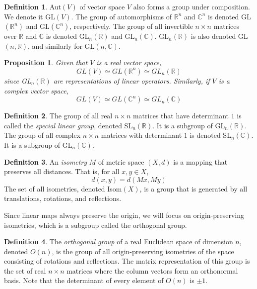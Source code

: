 \documentclass{article}
\newtheorem{proposition}[theorem]{Proposition}
\theoremstyle{remark}
\theoremstyle{definition}
\newtheorem{definition}{Definition}[section]
\begin{document}
    \begin{definition}
    Aut$(V)$ of vector space $V$ also forms a group under composition. We denote it GL$(V)$. The group of automorphisms of $\mathbb{R}^n$ and $\mathbb{C}^n$ is denoted GL$(\mathbb{R}^n)$ and GL$(\mathbb{C}^n)$, respectively. The group of all invertible $n \times n$ matrices over $\mathbb{R}$ and $\mathbb{C}$ is denoted GL$_n(\mathbb{R})$ and GL$_n(\mathbb{C})$. GL$_n(\mathbb{R})$ is also denoted GL$(n, \mathbb{R})$, and similarly for GL$(n, \mathbb{C})$. 
    \end{definition}

    \begin{proposition}
    Given that $V$ is a real vector space, 
    \[GL(V) \simeq GL(\mathbb{R}^n) \simeq GL_n (\mathbb{R})\]
    since GL$_n(\mathbb{R})$ are representations of linear operators. Similarly, if $V$ is a complex vector space, 
    \[GL(V) \simeq GL(\mathbb{C}^n) \simeq GL_n (\mathbb{C})\]
    \end{proposition}

    \begin{definition}
    The group of all real $n \times n$ matrices that have determinant $1$ is called the \textit{special linear group}, denoted SL$_n (\mathbb{R})$. It is a subgroup of GL$_n (\mathbb{R})$. The group of all complex $n \times n$ matrices with determinant $1$ is denoted SL$_n (\mathbb{C})$. It is a subgroup of GL$_n(\mathbb{C})$. 
    \end{definition}

    \begin{definition}
    An \textit{isometry} $M$ of metric space $(X, d)$ is a mapping that preserves all distances. That is, for all $x, y \in X$, 
    \[d(x, y) = d(M x, M y) \]
    The set of all isometries, denoted Isom$(X)$, is a group that is generated by all translations, rotations, and reflections. 
    \end{definition}

    Since linear maps always preserve the origin, we will focus on origin-preserving isometries, which is a subgroup called the orthogonal group.

    \begin{definition}
    The \textit{orthogonal group} of a real Euclidean space of dimension $n$, denoted $O(n)$, is the group of all origin-preserving isometries of the space consisting of rotations and reflections. The matrix representation of this group is the set of real $n \times n$ matrices where the column vectors form an orthonormal basis. Note that the determinant of every element of $O(n)$ is $\pm 1$. 
    \end{definition}
\end{document}
